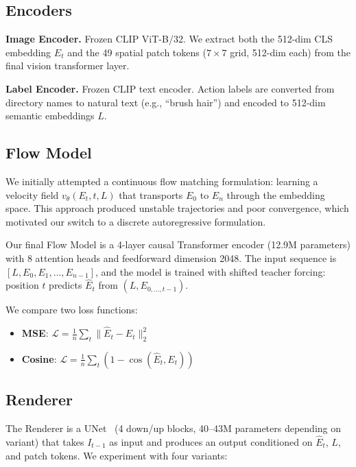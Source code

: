\documentclass[10pt,twocolumn,letterpaper]{article}
\begin{document}
\subsection{Encoders}

\textbf{Image Encoder.} Frozen CLIP ViT-B/32. We extract both the 512-dim
CLS embedding $E_t$ and the 49 spatial patch tokens ($7\times 7$ grid,
512-dim each) from the final vision transformer layer.

\textbf{Label Encoder.} Frozen CLIP text encoder. Action labels are
converted from directory names to natural text (e.g., ``brush hair'') and
encoded to 512-dim semantic embeddings $L$.

\subsection{Flow Model}

We initially attempted a continuous flow matching formulation: learning a
velocity field $v_\theta(E_t, t, L)$ that transports $E_0$ to $E_n$ through
the embedding space. This approach produced unstable trajectories and poor
convergence, which motivated our switch to a discrete autoregressive
formulation.

Our final Flow Model is a 4-layer causal Transformer encoder (12.9M
parameters) with 8 attention heads and feedforward dimension 2048. The
input sequence is $[L, E_0, E_1, \dots, E_{n-1}]$, and the model is
trained with shifted teacher forcing: position $t$ predicts $\hat{E}_{t}$
from $(L, E_{0, \dots, t-1})$.

We compare two loss functions:
\begin{itemize}
    \item \textbf{MSE}: $\mathcal{L} = \frac{1}{n}\sum_t \|\hat{E}_t - E_t\|_2^2$
    \item \textbf{Cosine}: $\mathcal{L} = \frac{1}{n}\sum_t (1 - \cos(\hat{E}_t, E_t))$
\end{itemize}

\subsection{Renderer}

The Renderer is a UNet~\cite{ronneberger2015} (4 down/up blocks,
40--43M parameters depending on variant) that takes $I_{t-1}$ as input and produces an output conditioned
on $\hat{E}_t$, $L$, and patch tokens. We experiment with four variants:
\end{document}
